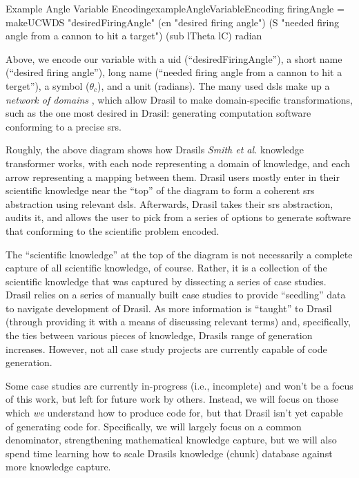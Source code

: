 \begin{pseudohaskell}{Example Angle Variable Encoding}{exampleAngleVariableEncoding}
firingAngle = makeUCWDS "desiredFiringAngle"
    (cn "desired firing angle")
    (S "needed firing angle from a cannon to hit a target")
    (sub lTheta lC)
    radian
\end{pseudohaskell}

Above, we encode our variable with a \acf{uid} (``desiredFiringAngle''), a short
name (``desired firing angle''), long name (``needed firing angle from a cannon
to hit a terget''), a symbol (\(\theta{}_{c}\)), and a unit (radians). The many
used \acsp{dsl} make up a \textit{network of domains} \cite{Czarnecki2005},
which allow Drasil to make domain-specific transformations, such as the one most
desired in Drasil: generating computation software conforming to a precise
\acs{srs}.

\roughNetworkOfDomainsIntro{}

Roughly, the above diagram shows how Drasils \textit{Smith et al.} knowledge
transformer works, with each node representing a domain of knowledge, and each
arrow representing a mapping between them. Drasil users mostly enter in their
scientific knowledge near the ``top'' of the diagram to form a coherent
\acs{srs} abstraction using relevant \acsp{dsl}. Afterwards, Drasil takes their
\acs{srs} abstraction, audits it, and allows the user to pick from a series of
options to generate software that conforming to the scientific problem encoded.

The ``scientific knowledge'' at the top of the diagram is not necessarily a
complete capture of all scientific knowledge, of course. Rather, it is a
collection of the scientific knowledge that was captured by dissecting a series
of case studies. Drasil relies on a series of manually built case studies to
provide ``seedling'' data to navigate development of Drasil. As more information
is ``taught'' to Drasil (through providing it with a means of discussing
relevant terms) and, specifically, the ties between various pieces of knowledge,
Drasils range of generation increases. However, not all case study projects are
currently capable of code generation.

Some case studies are currently in-progress (i.e., incomplete) and won't be a
focus of this work, but left for future work by others. Instead, we will focus
on those which \textit{we} understand how to produce code for, but that Drasil
isn't yet capable of generating code for. Specifically, we will largely focus on
a common denominator, strengthening mathematical knowledge capture, but we will
also spend time learning how to scale Drasils knowledge (chunk) database against
more knowledge capture.

